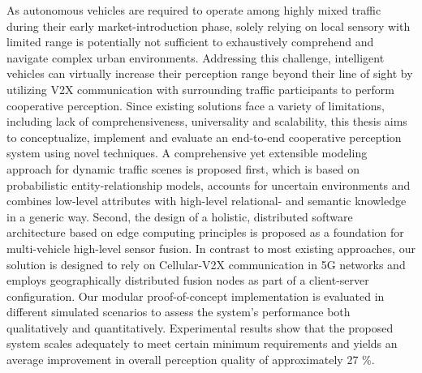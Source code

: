 As autonomous vehicles are required to operate among highly mixed traffic during their early market-introduction phase, solely relying on local sensory with limited range is potentially not sufficient to exhaustively comprehend and navigate complex urban environments. Addressing this challenge, intelligent vehicles can virtually increase their perception range beyond their line of sight by utilizing V2X communication with surrounding traffic participants to perform cooperative perception. Since existing solutions face a variety of limitations, including lack of comprehensiveness, universality and scalability, this thesis aims to conceptualize, implement and evaluate an end-to-end cooperative perception system using novel techniques. A comprehensive yet extensible modeling approach for dynamic traffic scenes is proposed first, which is based on probabilistic entity-relationship models, accounts for uncertain environments and combines low-level attributes with high-level relational- and semantic knowledge in a generic way. Second, the design of a holistic, distributed software architecture based on edge computing principles is proposed as a foundation for multi-vehicle high-level sensor fusion. In contrast to most existing approaches, our solution is designed to rely on Cellular-V2X communication in 5G networks and employs geographically distributed fusion nodes as part of a client-server configuration. Our modular proof-of-concept implementation is evaluated in different simulated scenarios to assess the system's performance both qualitatively and quantitatively. Experimental results show that the proposed system scales adequately to meet certain minimum requirements and yields an average improvement in overall perception quality of approximately 27 \%.